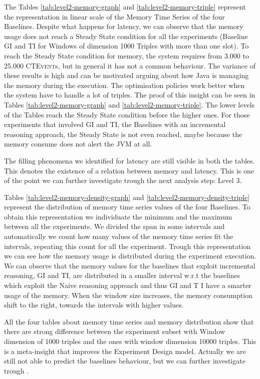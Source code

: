 The Tables \ref{tab:level2-memory-graph} and \ref{tab:level2-memory-triple} represent the  representation in linear scale of the Memory Time Series of the four Baselines. Despite what happens for latency, we can observe that the memory usage does not reach a Steady State condition for all the experiments (Baseline GI and TI for Windows of dimension 1000 Triples with more than one slot).  To reach the Steady State condition for memory, the system requires from 3.000 to 25.000 \textsc{CTEvent}s, but in general it has not a common behaviour. The variance of these results is high and can be motivated arguing about how Java is managing the memory during the execution. The optimisation policies work better when the system have to handle a lot of triples. The proof of this insight can be seen in Tables \ref{tab:level2-memory-graph} and \ref{tab:level2-memory-triple}. The lower levels of the Tables reach the Steady State condition before the higher ones. For those experiments that involved GI and TI, the Baselines with an incremental reasoning approach, the Steady State is not even reached, maybe because the memory consume does not alert the JVM at all. 

The filling phenomena we identified for latency are still visible in both the tables. This denotes the existence of a relation between memory and latency. This is one of the point we can further investigate trough the next analysis step: Level 3.

Tables \ref{tab:level2-memory-density-graph} and \ref{tab:level2-memory-density-triple} represent the distribution of memory time series values of the four Baselines. To obtain this representation we individuate the minimum and the maximum between all the experiments. We divided the span in some intervals and automatically we count how many values of the memory time series fit the intervals, repeating this count for all the experiment. Trough this representation we can see how the memory usage is distributed during the experiment execution. We can observe that the memory values for the baselines that exploit incremental reasoning, GI and TI, are distributed in a smaller interval w.r.t the baselines which exploit the Naive reasoning approach and thus GI and T I have a smarter usage of the memory. When the window size increases, the memory consumption shift to the right, towards the intervals with higher values.

All the four tables about memory time series and memory distribution show that there are strong difference between the experiment subset with Window dimension of 1000  triples and the ones with window dimension 10000 triples. This is a meta-insight that improves the Experiment Design model. Actually we are still not able to predict the baselines behaviour, but we can further investigate trough \namens.

